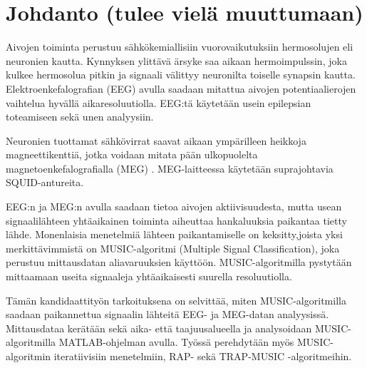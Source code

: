 \section{Johdanto (tulee vielä muuttumaan)}
Aivojen toiminta perustuu sähkökemiallisiin vuorovaikutuksiin hermosolujen eli neuronien kautta. Kynnyksen ylittävä ärsyke saa aikaan hermoimpulssin, joka kulkee hermosolua pitkin ja signaali välittyy neuronilta toiselle synapsin kautta.\cite{} 
Elektroenkefalografian (EEG) avulla saadaan mitattua aivojen potentiaalierojen vaihtelua hyvällä aikaresoluutiolla. EEG:tä käytetään usein epilepsian toteamiseen sekä unen analyysiin. \cite{Nunez2006ElectricEEG}

Neuronien tuottamat sähkövirrat saavat aikaan ympärilleen heikkoja magneettikenttiä, jotka voidaan mitata pään ulkopuolelta magnetoenkefalografialla (MEG) \cite{Hamalainen1993MagnetoencephalographytheoryBrain}. MEG-laitteessa käytetään suprajohtavia SQUID-antureita. 

EEG:n ja MEG:n avulla saadaan tietoa aivojen aktiivisuudesta, mutta usean signaalilähteen yhtäaikainen toiminta aiheuttaa hankaluuksia paikantaa tietty lähde. Monenlaisia menetelmiä lähteen paikantamiselle on keksitty,joista yksi merkittävimmistä on MUSIC-algoritmi (Multiple Signal Classification), joka perustuu mittausdatan aliavaruuksien käyttöön. MUSIC-algoritmilla pystytään mittaamaan useita signaaleja yhtäaikaisesti suurella resoluutiolla. \cite{Mosher1999SourceMUSIC}

Tämän kandidaattityön tarkoituksena on selvittää, miten MUSIC-algoritmilla saadaan paikannettua signaalin lähteitä EEG- ja MEG-datan analyysissä. Mittausdataa kerätään sekä aika- että taajuusalueella ja analysoidaan MUSIC-algoritmilla MATLAB-ohjelman avulla. Työssä perehdytään myös MUSIC-algoritmin iteratiivisiin menetelmiin, RAP- sekä TRAP-MUSIC -algoritmeihin.
